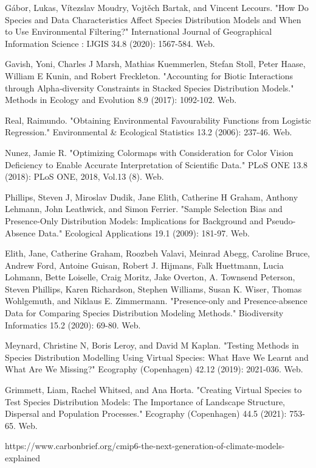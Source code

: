 \documentclass[12pt,a4paper]{article}
\begin{document}
\begin{thebibliography}{999}
Gábor, Lukas, Vítezslav Moudry, Vojtěch Bartak, and Vincent Lecours. "How Do Species and Data Characteristics Affect Species Distribution Models and When to Use Environmental Filtering?" International Journal of Geographical Information Science : IJGIS 34.8 (2020): 1567-584. Web.


Gavish, Yoni, Charles J Marsh, Mathias Kuemmerlen, Stefan Stoll, Peter Haase, William E Kunin, and Robert Freckleton. "Accounting for Biotic Interactions through Alpha‐diversity Constraints in Stacked Species Distribution Models." Methods in Ecology and Evolution 8.9 (2017): 1092-102. Web.


Real, Raimundo. "Obtaining Environmental Favourability Functions from Logistic Regression." Environmental & Ecological Statistics 13.2 (2006): 237-46. Web.


Nunez, Jamie R. "Optimizing Colormaps with Consideration for Color Vision Deficiency to Enable Accurate Interpretation of Scientific Data." PLoS ONE 13.8 (2018): PLoS ONE, 2018, Vol.13 (8). Web.

Phillips, Steven J, Miroslav Dudik, Jane Elith, Catherine H Graham, Anthony Lehmann, John Leathwick, and Simon Ferrier. "Sample Selection Bias and Presence-Only Distribution Models: Implications for Background and Pseudo-Absence Data." Ecological Applications 19.1 (2009): 181-97. Web.


Elith, Jane, Catherine Graham, Roozbeh Valavi, Meinrad Abegg, Caroline Bruce, Andrew Ford, Antoine Guisan, Robert J. Hijmans, Falk Huettmann, Lucia Lohmann, Bette Loiselle, Craig Moritz, Jake Overton, A. Townsend Peterson, Steven Phillips, Karen Richardson, Stephen Williams, Susan K. Wiser, Thomas Wohlgemuth, and Niklaus E. Zimmermann. "Presence-only and Presence-absence Data for Comparing Species Distribution Modeling Methods." Biodiversity Informatics 15.2 (2020): 69-80. Web.


Meynard, Christine N, Boris Leroy, and David M Kaplan. "Testing Methods in Species Distribution Modelling Using Virtual Species: What Have We Learnt and What Are We Missing?" Ecography (Copenhagen) 42.12 (2019): 2021-036. Web.

Grimmett, Liam, Rachel Whitsed, and Ana Horta. "Creating Virtual Species to Test Species Distribution Models: The Importance of Landscape Structure, Dispersal and Population Processes." Ecography (Copenhagen) 44.5 (2021): 753-65. Web.


https://www.carbonbrief.org/cmip6-the-next-generation-of-climate-models-explained


\end{thebibliography}
\end{document}
